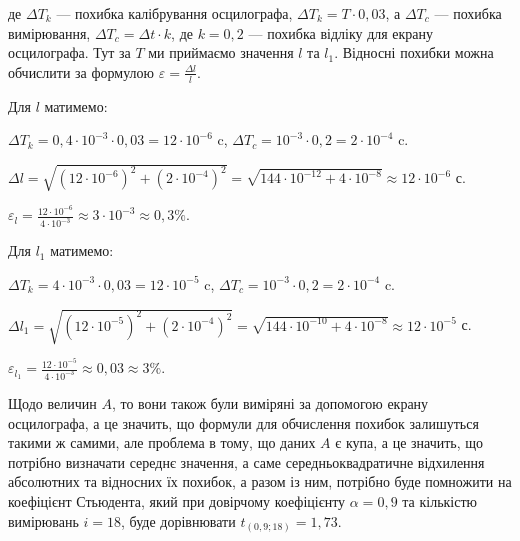 \documentclass[12pt,a4paper]{article}
\begin{document}
    де $\Delta T_k$ --- похибка калібрування осцилографа, $\Delta T_k = T \cdot 0,03$, а $\Delta T_c$ --- похибка вимірювання, $\Delta T_c = \Delta t \cdot k$, де $k = 0,2$ --- похибка відліку для екрану осцилографа.
    Тут за $T$ ми приймаємо значення $l$ та $l_1$. Відносні похибки можна обчислити за формулою $\displaystyle \varepsilon = \frac{\Delta l}{l}$.

    Для $l$ матимемо:

    \vspace{1em} %

    $\displaystyle \Delta T_k = 0,4 \cdot 10^{-3} \cdot 0,03 = 12 \cdot 10^{-6}$ c, $\displaystyle \Delta T_c = 10^{-3} \cdot 0,2 = 2 \cdot 10^{-4}$ c.

    $\displaystyle \Delta l = \sqrt{\left( 12 \cdot 10^{-6}\right)^2 + \left(2 \cdot 10^{-4}\right)^2} = \sqrt{144 \cdot 10^{-12} + 4 \cdot 10^{-8}} \approx 12 \cdot 10^{-6}$ с.

    $\displaystyle \varepsilon_l = \frac{12 \cdot 10^{-6}}{4 \cdot 10^{-3}} \approx 3 \cdot 10^{-3} \approx 0,3\%$.

    \vspace{1em} %

    Для $l_1$ матимемо:

    \vspace{1em} %

    $\displaystyle \Delta T_k = 4 \cdot 10^{-3} \cdot 0,03 = 12 \cdot 10^{-5}$ c, $\displaystyle \Delta T_c = 10^{-3} \cdot 0,2 = 2 \cdot 10^{-4}$ c.

    $\displaystyle \Delta l_1 = \sqrt{\left( 12 \cdot 10^{-5}\right)^2 + \left(2 \cdot 10^{-4}\right)^2} = \sqrt{144 \cdot 10^{-10} + 4 \cdot 10^{-8}} \approx 12 \cdot 10^{-5}$ с.

    $\displaystyle \varepsilon_{l_1} = \frac{12 \cdot 10^{-5}}{4 \cdot 10^{-3}} \approx 0,03 \approx 3\%$.

    \vspace{1em} %

    Щодо величин $A$, то вони також були виміряні за допомогою екрану осцилографа, а це значить, що формули для обчислення похибок залишуться такими ж самими, але проблема в тому, що
    даних $A$ є купа, а це значить, що потрібно визначати середнє значення, а саме середньоквадратичне відхилення абсолютних та відносних їх похибок, а разом із ним, потрібно буде помножити на коефіцієнт
    Стьюдента, який при довірчому коефіцієнту $\alpha = 0,9$ та кількістю вимірювань $i = 18$, буде дорівнювати $t_{(0,9; 18)} = 1,73$.
\end{document}
